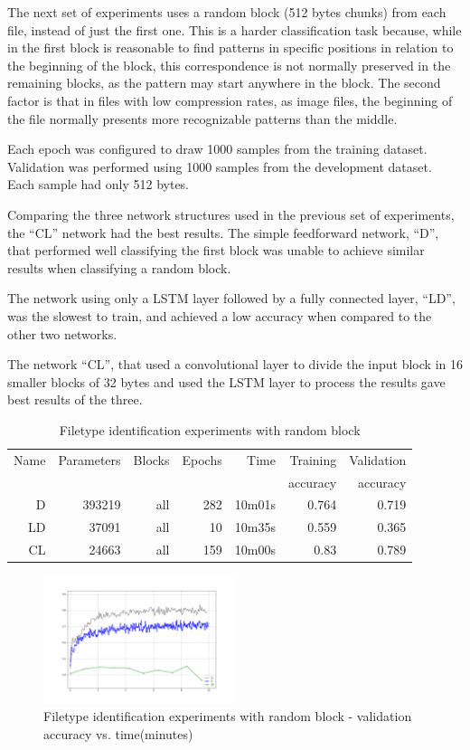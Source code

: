 The next set of experiments uses a random block (512 bytes chunks) from each file, instead of just the first one. This is a harder classification task because, while in the first block is reasonable to find patterns in specific positions in relation to the beginning of the block, this correspondence is not normally preserved in the remaining blocks, as the pattern may start anywhere in the block. The second factor is that in files with low compression rates, as image files, the beginning of the file normally presents more recognizable patterns than the middle.

Each epoch was configured to draw 1000 samples from the training dataset. Validation was performed using 1000 samples from the development dataset. Each sample had only 512 bytes.

Comparing the three network structures used in the previous set of experiments, the ``CL'' network had the best results.
The simple feedforward network, ``D'', that performed well classifying the first block was unable to achieve similar results when classifying a random block.

The network using only a LSTM layer followed by a fully connected layer, ``LD'', was the slowest to train, and achieved a low accuracy when compared to the other two networks.

The network ``CL'', that used a convolutional layer to divide the input block in 16 smaller blocks of 32 bytes and used the LSTM layer to process the results gave best results of the three.

\begin{table}[!ht]
    \centering
    \caption{Filetype identification experiments with random block}
    \label{tab:carvingrandomblock}
\begin{tabular}{r|r|r|r|r|r|r}
\hline
Name & Parameters & Blocks & Epochs & Time    & Training          & Validation          \\       
     &            &        &        &         &          accuracy &            accuracy \\ \hline\hline

D       & 393219    & all   & 282   & 10m01s    & 0.764 & 0.719 \\\hline
LD      & 37091     & all   & 10    & 10m35s    & 0.559 & 0.365 \\\hline
CL      & 24663     & all   & 159   & 10m00s    & 0.83  & 0.789 \\\hline
\end{tabular}
\end{table}

\noindent
\begin{figure}[htb!]
\centering\includegraphics[width=0.50\textwidth]{content/CL-D-LD.png}
\caption[Experiments with random blocks]{\label{fig:randomblock}Filetype identification experiments with random block - validation accuracy vs. time(minutes)}%
\end{figure}
